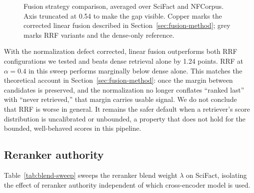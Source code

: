 \documentclass[11pt]{article}
\begin{document}
\begin{figure}[htbp]
\centering
{}
\caption{Fusion strategy comparison, averaged over SciFact and NFCorpus. Axis truncated at 0.54 to make the gap visible. Copper marks the corrected linear fusion described in Section~\ref{sec:fusion-method}; grey marks RRF variants and the dense-only reference.}
\label{fig:fusion-sweep}
\end{figure}

With the normalization defect corrected, linear fusion outperforms both RRF configurations we tested and beats dense retrieval alone by 1.24 points. RRF at $\alpha=0.4$ in this sweep performs marginally below dense alone. This matches the theoretical account in Section~\ref{sec:fusion-method}: once the margin between candidates is preserved, and the normalization no longer conflates ``ranked last'' with ``never retrieved,'' that margin carries usable signal. We do not conclude that RRF is worse in general. It remains the safer default when a retriever's score distribution is uncalibrated or unbounded, a property that does not hold for the bounded, well-behaved scores in this pipeline.

\subsection{Reranker authority}

Table~\ref{tab:blend-sweep} sweeps the reranker blend weight $\lambda$ on SciFact, isolating the effect of reranker authority independent of which cross-encoder model is used.
\end{document}
